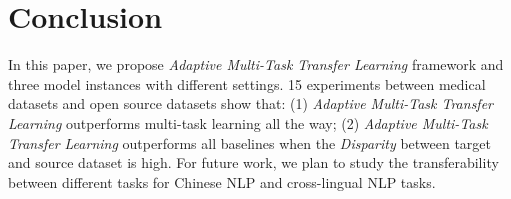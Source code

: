 \section{Conclusion}

In this paper, we propose \textit{Adaptive Multi-Task Transfer Learning} framework and three model instances with different settings. 15 experiments between medical datasets and open source datasets show that: (1) \textit{Adaptive Multi-Task Transfer Learning} outperforms multi-task learning all the way; (2) \textit{Adaptive Multi-Task Transfer Learning} outperforms all baselines when the \textit{Disparity} between target and source dataset is high. For future work, we plan to study the transferability between different tasks for Chinese NLP and cross-lingual NLP tasks.
